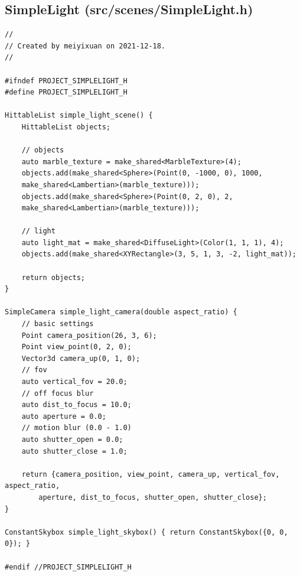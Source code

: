 \documentclass[utf8]{article}
\begin{document}
\subsection{SimpleLight (src/scenes/SimpleLight.h)}
\begin{lstlisting}[style=CStyle]
//
// Created by meiyixuan on 2021-12-18.
//

#ifndef PROJECT_SIMPLELIGHT_H
#define PROJECT_SIMPLELIGHT_H

HittableList simple_light_scene() {
	HittableList objects;
	
	// objects
	auto marble_texture = make_shared<MarbleTexture>(4);
	objects.add(make_shared<Sphere>(Point(0, -1000, 0), 1000,
	make_shared<Lambertian>(marble_texture)));
	objects.add(make_shared<Sphere>(Point(0, 2, 0), 2,
	make_shared<Lambertian>(marble_texture)));
	
	// light
	auto light_mat = make_shared<DiffuseLight>(Color(1, 1, 1), 4);
	objects.add(make_shared<XYRectangle>(3, 5, 1, 3, -2, light_mat));
	
	return objects;
}

SimpleCamera simple_light_camera(double aspect_ratio) {
	// basic settings
	Point camera_position(26, 3, 6);
	Point view_point(0, 2, 0);
	Vector3d camera_up(0, 1, 0);
	// fov
	auto vertical_fov = 20.0;
	// off focus blur
	auto dist_to_focus = 10.0;
	auto aperture = 0.0;
	// motion blur (0.0 - 1.0)
	auto shutter_open = 0.0;
	auto shutter_close = 1.0;
	
	return {camera_position, view_point, camera_up, vertical_fov, aspect_ratio,
		aperture, dist_to_focus, shutter_open, shutter_close};
}

ConstantSkybox simple_light_skybox() { return ConstantSkybox({0, 0, 0}); }

#endif //PROJECT_SIMPLELIGHT_H

\end{lstlisting}
\end{document}
